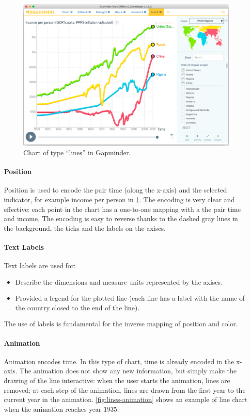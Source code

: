 \begin{figure}[h]
	\centering
	\includegraphics[width=0.95\columnwidth]{figures/lines}
	\caption{Chart of type ``lines'' in Gapminder.}
	\label{fig:lines}
\end{figure}

\paragraph{Position}
Position is used to encode the pair time (along the x-axis) and the selected indicator, for example income per person in \cref{fig:lines}.
The encoding is very clear and effective:
each point in the chart has a one-to-one mapping with a the pair time and income.
The encoding is easy to reverse thanks to the dashed gray lines in the background, the ticks and the labels on the axises.

\paragraph{Text Labels}
Text labels are used for:
\begin{itemize}
	\item Describe the dimensions and measure units represented by the axises.
	\item Provided a legend for the plotted line (each line has a label with the name of the country closed to the end of the line).
\end{itemize}
The use of labels is fundamental for the inverse mapping of position and color.

\paragraph{Animation}
Animation encodes time.
In this type of chart, time is already encoded in the x-axis.
The animation does not show any new information, but simply make the drawing of the line interactive:
when the user starts the animation, lines are removed;
at each step of the animation, lines are drawn from the first year to the current year in the animation.
\cref{fig:lines-animation} shows an example of line chart when the animation reaches year $1935$.

